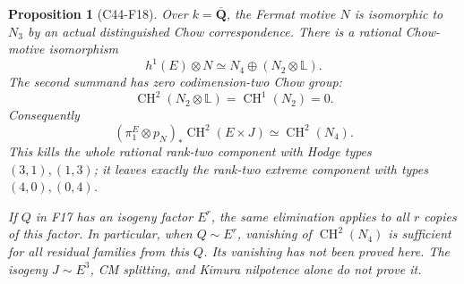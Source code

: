 \documentclass[11pt]{article}
\newtheorem{proposition}[theorem]{Proposition}
\theoremstyle{remark}\newtheorem{remark}[theorem]{Remark}
\begin{document}
\begin{proposition}[C44-F18]\label{C44-F18}
Over $k=\overline{\mathbf Q}$, the Fermat motive $N$ is
isomorphic to $N_3$ by an actual distinguished Chow
correspondence.  There is a rational Chow-motive isomorphism
\[
               h^1(E)\otimes N
                 \simeq N_4\oplus (N_2\otimes\mathbb L).
 \tag{F18.2}
\]
The second summand has zero codimension-two Chow group:
\[
              \operatorname{CH}^2(N_2\otimes\mathbb L)
                   =\operatorname{CH}^1(N_2)=0.
 \tag{F18.3}
\]
Consequently
\[
 (\pi_1^E\otimes p_N)_*\operatorname{CH}^2(E\times J)
                    \simeq\operatorname{CH}^2(N_4).
 \tag{F18.4}
\]
This kills the whole rational rank-two component with Hodge
types $(3,1),(1,3)$; it leaves exactly the rank-two extreme
component with types $(4,0),(0,4)$.

If $Q$ in F17 has an isogeny factor $E^r$, the same
elimination applies to all $r$ copies of this factor.  In
particular, when $Q\sim E^r$, vanishing of
$\operatorname{CH}^2(N_4)$ is sufficient for all residual
families from this $Q$.  Its vanishing has not been proved
here.  The isogeny $J\sim E^3$, CM splitting, and Kimura
nilpotence alone do not prove it.
\end{proposition}
\end{document}
